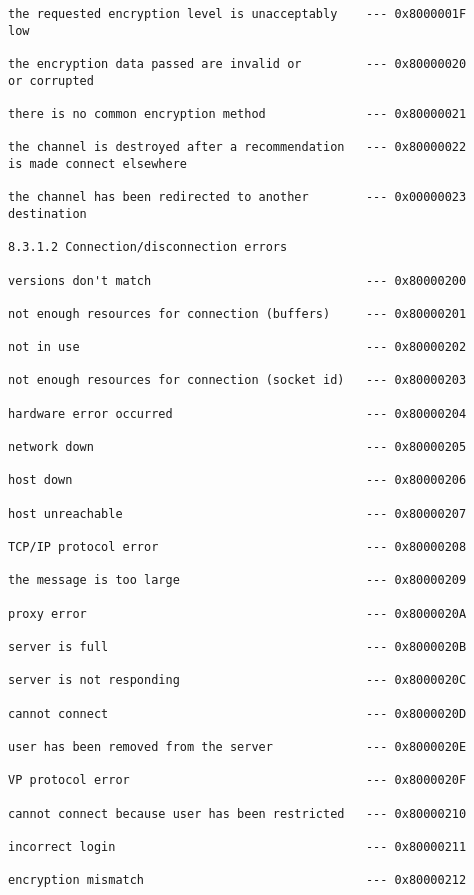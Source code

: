 \documentclass[titlepage,oneside]{book}
\begin{document}
\begin{verbatim}
the requested encryption level is unacceptably    --- 0x8000001F
low

the encryption data passed are invalid or         --- 0x80000020
or corrupted

there is no common encryption method              --- 0x80000021

the channel is destroyed after a recommendation   --- 0x80000022
is made connect elsewhere

the channel has been redirected to another        --- 0x00000023
destination

8.3.1.2 Connection/disconnection errors

versions don't match                              --- 0x80000200

not enough resources for connection (buffers)     --- 0x80000201

not in use                                        --- 0x80000202

not enough resources for connection (socket id)   --- 0x80000203

hardware error occurred                           --- 0x80000204

network down                                      --- 0x80000205

host down                                         --- 0x80000206

host unreachable                                  --- 0x80000207

TCP/IP protocol error                             --- 0x80000208

the message is too large                          --- 0x80000209

proxy error                                       --- 0x8000020A

server is full                                    --- 0x8000020B

server is not responding                          --- 0x8000020C

cannot connect                                    --- 0x8000020D

user has been removed from the server             --- 0x8000020E

VP protocol error                                 --- 0x8000020F

cannot connect because user has been restricted   --- 0x80000210

incorrect login                                   --- 0x80000211

encryption mismatch                               --- 0x80000212


\end{verbatim}
\end{document}

